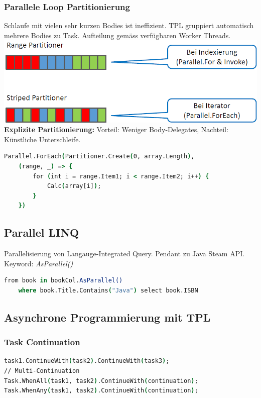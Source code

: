 \subsubsection{Parallele Loop Partitionierung}
Schlaufe mit vielen sehr kurzen Bodies ist ineffizient.
TPL gruppiert automatisch mehrere Bodies zu Task.
Aufteilung gemäss verfügbaren Worker Threads.\\
\includegraphics[width=0.7\linewidth]{img/partitionierung.png}\\ 
\textbf{Explizite Partitionierung:} Vorteil: Weniger Body-Delegates, Nachteil: Künstliche Unterschleife.
\begin{lstlisting}[language=csh]
Parallel.ForEach(Partitioner.Create(0, array.Length), 
    (range, _) => {
        for (int i = range.Item1; i < range.Item2; i++) {
            Calc(array[i]);
        }
    })
\end{lstlisting}

\subsection{Parallel LINQ}
Parallelisierung von Langauge-Integrated Query. Pendant zu Java Steam API.
Keyword: \textit{AsParallel()}
\begin{lstlisting}[language=csh]
from book in bookCol.AsParallel()
    where book.Title.Contains("Java") select book.ISBN
\end{lstlisting}

\subsection{Asynchrone Programmierung mit TPL}
\subsubsection{Task Continuation}
\begin{lstlisting}[language=csh]
task1.ContinueWith(task2).ContinueWith(task3);
// Multi-Continuation
Task.WhenAll(task1, task2).ContinueWith(continuation);
Task.WhenAny(task1, task2).ContinueWith(continuation);
\end{lstlisting}